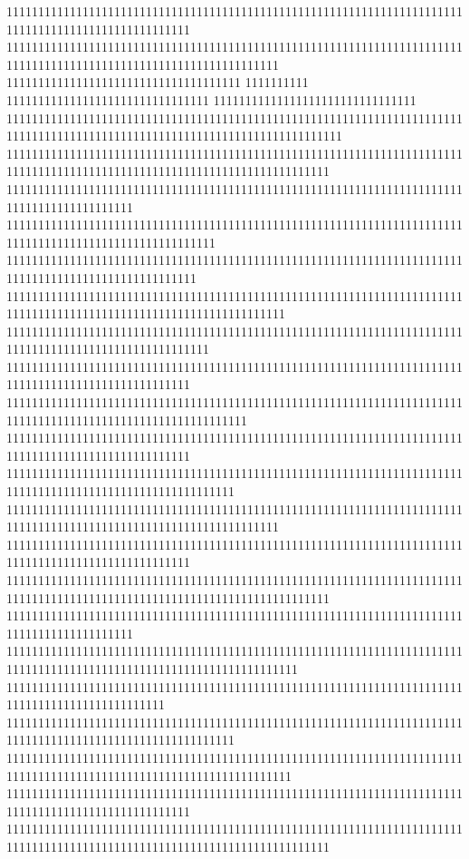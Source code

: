 11111111111111111111111111111111111111111111111111111111111111111111111111111111111111111111111111111
1111111111111111111111111111111111111111111111111111111111111111111111111111111111111111111111111111111111111111111
1111111111111111111111111111111111111
1111111111
11111111111111111111111111111111
11111111111111111111111111111111
11111111111111111111111111111111111111111111111111111111111111111111111111111111111111111111111111111111111111111111111111111
111111111111111111111111111111111111111111111111111111111111111111111111111111111111111111111111111111111111111111111111111
11111111111111111111111111111111111111111111111111111111111111111111111111111111111111111111
111111111111111111111111111111111111111111111111111111111111111111111111111111111111111111111111111111111
111111111111111111111111111111111111111111111111111111111111111111111111111111111111111111111111111111
11111111111111111111111111111111111111111111111111111111111111111111111111111111111111111111111111111111111111111111
11111111111111111111111111111111111111111111111111111111111111111111111111111111111111111111111111111111
11111111111111111111111111111111111111111111111111111111111111111111111111111111111111111111111111111
11111111111111111111111111111111111111111111111111111111111111111111111111111111111111111111111111111111111111
11111111111111111111111111111111111111111111111111111111111111111111111111111111111111111111111111111
111111111111111111111111111111111111111111111111111111111111111111111111111111111111111111111111111111111111
1111111111111111111111111111111111111111111111111111111111111111111111111111111111111111111111111111111111111111111
11111111111111111111111111111111111111111111111111111111111111111111111111111111111111111111111111111
111111111111111111111111111111111111111111111111111111111111111111111111111111111111111111111111111111111111111111111111111
11111111111111111111111111111111111111111111111111111111111111111111111111111111111111111111
1111111111111111111111111111111111111111111111111111111111111111111111111111111111111111111111111111111111111111111111
1111111111111111111111111111111111111111111111111111111111111111111111111111111111111111111111111
111111111111111111111111111111111111111111111111111111111111111111111111111111111111111111111111111111111111
111111111111111111111111111111111111111111111111111111111111111111111111111111111111111111111111111111111111111111111
11111111111111111111111111111111111111111111111111111111111111111111111111111111111111111111111111111
111111111111111111111111111111111111111111111111111111111111111111111111111111111111111111111111111111111111111111111111111
